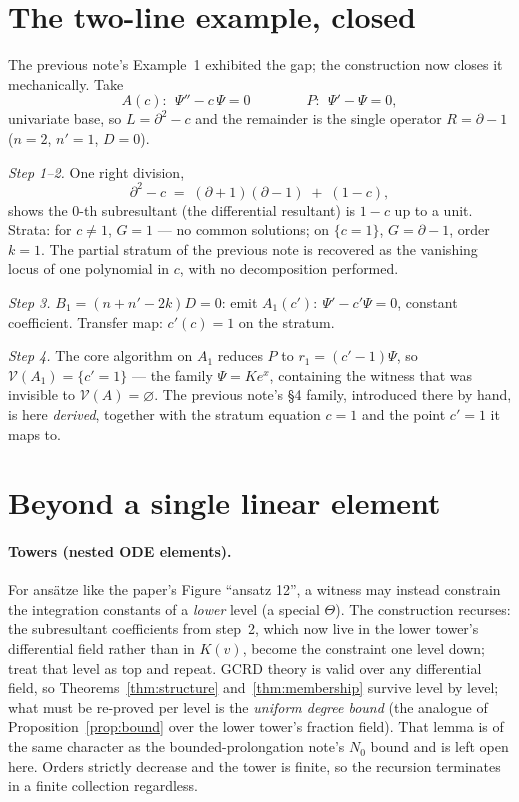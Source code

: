 \documentclass[11pt]{article}
\newcommand{\Var}{\mathcal{V}}
\begin{document}
\section{The two-line example, closed}

The previous note's Example~1 exhibited the gap; the construction now closes
it mechanically. Take
\[
A(c):\ \ \Psi'' - c\,\Psi = 0
\qquad\qquad
P:\ \ \Psi' - \Psi = 0 ,
\]
univariate base, so $L = \partial^2 - c$ and the remainder is the single
operator $R = \partial - 1$ ($n = 2$, $n' = 1$, $D = 0$).

\emph{Step 1--2.} One right division,
\[
\partial^2 - c \;=\; (\partial + 1)(\partial - 1) \;+\; (1 - c),
\]
shows the $0$-th subresultant (the differential resultant) is $1 - c$ up to a
unit. Strata: for $c \neq 1$, $G = 1$ --- no common solutions; on
$\{c = 1\}$, $G = \partial - 1$, order $k = 1$. The partial stratum of the
previous note is recovered as the vanishing locus of one polynomial in $c$,
with no decomposition performed.

\emph{Step 3.} $B_1 = (n + n' - 2k)D = 0$: emit
$A_1(c'):\ \Psi' - c'\Psi = 0$, constant coefficient. Transfer map:
$c'(c) = 1$ on the stratum.

\emph{Step 4.} The core algorithm on $A_1$ reduces $P$ to
$r_1 = (c' - 1)\Psi$, so $\Var(A_1) = \{c' = 1\}$ --- the family
$\Psi = K e^{x}$, containing the witness that was invisible to $\Var(A) =
\varnothing$. The previous note's \S4 family, introduced there by hand, is
here \emph{derived}, together with the stratum equation $c = 1$ and the point
$c' = 1$ it maps to.

\section{Beyond a single linear element}
\label{sec:beyond}

\paragraph{Towers (nested ODE elements).}
For ans\"atze like the paper's Figure ``ansatz 12'', a witness may instead
constrain the integration constants of a \emph{lower} level (a special
$\Theta$). The construction recurses: the subresultant coefficients from
step~2, which now live in the lower tower's differential field rather than in
$K(v)$, become the constraint one level down; treat that level as top and
repeat. GCRD theory is valid over any differential field, so
Theorems~\ref{thm:structure} and~\ref{thm:membership} survive level by
level; what must be re-proved per level is the \emph{uniform degree bound}
(the analogue of Proposition~\ref{prop:bound} over the lower tower's fraction
field). That lemma is of the same character as the bounded-prolongation
note's $N_0$ bound and is left open here. Orders strictly decrease and the
tower is finite, so the recursion terminates in a finite collection
regardless.
\end{document}
